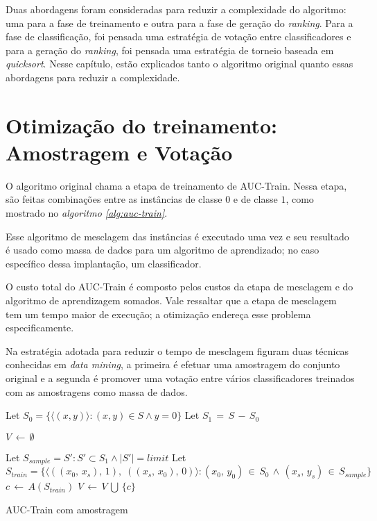 Duas abordagens foram consideradas para reduzir a complexidade do algoritmo: uma para a fase de treinamento e outra para a fase de geração do \emph{ranking}. Para a fase de classificação, foi pensada uma estratégia de votação entre classificadores e para a geração do \emph{ranking}, foi pensada uma estratégia de torneio baseada em \emph{quicksort}. Nesse capítulo, estão explicados tanto o algoritmo original quanto essas abordagens para reduzir a complexidade.

\section{Otimização do treinamento: Amostragem e Votação}
O algoritmo original chama a etapa de treinamento de AUC-Train. Nessa etapa, são feitas combinações entre as instâncias de classe $0$ e de classe $1$, como mostrado no \emph{algoritmo \ref{alg:auc-train}}.

Esse algoritmo de mesclagem das instâncias é executado uma vez e seu resultado é usado como massa de dados para um algoritmo de aprendizado; no caso específico dessa implantação, um classificador.

O custo total do AUC-Train é composto pelos custos da etapa de mesclagem e do algoritmo de aprendizagem somados. Vale ressaltar que a etapa de mesclagem tem um tempo maior de execução; a otimização endereça esse problema especificamente.

Na estratégia adotada para reduzir o tempo de mesclagem figuram duas técnicas conhecidas em \emph{data mining}, a primeira é efetuar uma amostragem do conjunto original e a segunda é promover uma votação entre vários classificadores treinados com as amostragens como massa de dados.

\begin{algorithm}
\begin{algorithmic}

\STATE Let $S_0 = \{\langle (x, y) \rangle: (x, y) \in S \wedge y = 0\}$
\STATE Let $S_1\,=\,S\,-\,S_0$

\STATE $V\,\gets\,\emptyset$

\STATE Let $S_{sample} = S' : S' \subset S_1 \wedge |S'| = limit$
\STATE Let $S_{train} = \{\langle ((x_{0},\,x_{s}),\, 1),\; ((x_{s},\, x_{0}),\,0) \rangle:
       (x_{0},\,y_{0})\,\in\,S_{0}\,\wedge\,
       (x_{s},\,y_{s})\,\in\,S_{sample}\}$
\STATE $c\,\gets\,A(S_{train})$
\STATE $V\,\gets\,V\,\bigcup\,\{c\}$
\ENDFOR

\caption{AUC-Train com amostragem}
\label{alg:auc-train-amostragem-votacao}

\end{algorithmic}
\end{algorithm}


